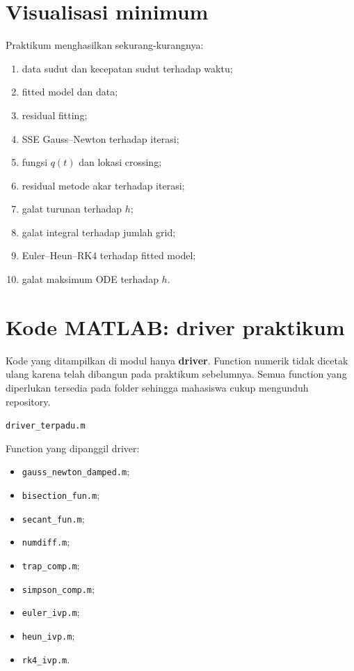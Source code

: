 \documentclass[book,english,noindex,lean,nobackpage,nocopyright,noupdate,nofiglist,notablist]{enacom}
\newcommand{\MatlabFile}[1]{\par\smallskip\noindent\texttt{#1}\par}
\begin{document}
\section{Visualisasi minimum}
Praktikum menghasilkan sekurang-kurangnya:
\begin{enumerate}
\item data sudut dan kecepatan sudut terhadap waktu;
\item fitted model dan data;
\item residual fitting;
\item SSE Gauss--Newton terhadap iterasi;
\item fungsi $q(t)$ dan lokasi crossing;
\item residual metode akar terhadap iterasi;
\item galat turunan terhadap $h$;
\item galat integral terhadap jumlah grid;
\item Euler--Heun--RK4 terhadap fitted model;
\item galat maksimum ODE terhadap $h$.
\end{enumerate}

\section{Kode MATLAB: driver praktikum}
Kode yang ditampilkan di modul hanya \textbf{driver}. Function numerik tidak dicetak ulang karena telah dibangun pada praktikum sebelumnya. Semua function yang diperlukan tersedia pada folder  sehingga mahasiswa cukup mengunduh repository.

\MatlabFile{driver\_terpadu.m}


Function yang dipanggil driver:
\begin{itemize}
\item \texttt{gauss\_newton\_damped.m};
\item \texttt{bisection\_fun.m};
\item \texttt{secant\_fun.m};
\item \texttt{numdiff.m};
\item \texttt{trap\_comp.m};
\item \texttt{simpson\_comp.m};
\item \texttt{euler\_ivp.m};
\item \texttt{heun\_ivp.m};
\item \texttt{rk4\_ivp.m}.
\end{itemize}
\end{document}
